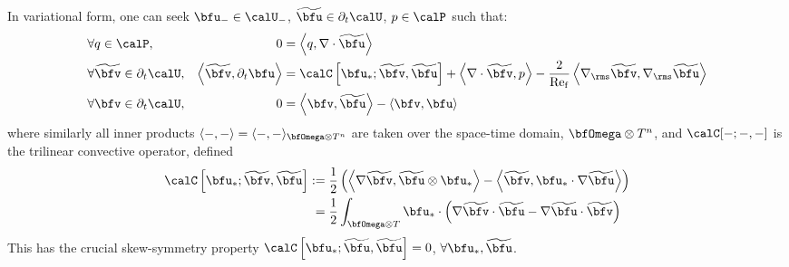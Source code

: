     In variational form, one can seek $\bfu_{-} \in \calU_{-}$, $\widetilde{\bfu} \in \partial_{t}\calU$, $p \in \calP$ such that:
    \begin{align}
        &\forall                 q  \in  \calP,              &                                                            0  &=  \left\langle q, \nabla\cdot\widetilde{\bfu}\right\rangle  \\
        &\forall  \widetilde{\bfv}  \in  \partial_{t}\calU,  &  \left\langle\widetilde{\bfv}, \partial_{t}\bfu\right\rangle  &=  \calC\left[\bfu_{*}; \widetilde{\bfv}, \widetilde{\bfu}\right] + \left\langle\nabla\cdot\widetilde{\bfv}, p\right\rangle - \frac{2}{\rmRef}\left\langle\nabla_{\rms}\widetilde{\bfv}, \nabla_{\rms}\widetilde{\bfu}\right\rangle  \\
        &\forall              \bfv  \in  \partial_{t}\calU,  &                                                            0  &=  \left\langle\bfv, \widetilde{\bfu}\right\rangle - \left\langle\bfv, \bfu\right\rangle
    \end{align}
    where similarly all inner products $\langle -, -\rangle  =  \langle -, -\rangle_{\bfOmega\otimes T^{n}}$ are taken over the space-time domain, $\bfOmega\otimes T^{n}$, and $\calC[-; -, -]$ is the trilinear convective operator, defined
    \begin{align}
        \calC\left[\bfu_{*}; \widetilde{\bfv}, \widetilde{\bfu}\right]  :=  &\;\frac{1}{2}\left(\left\langle\nabla\widetilde{\bfv}, \widetilde{\bfu}\otimes\bfu_{*}\right\rangle - \left\langle\widetilde{\bfv}, \bfu_{*}\cdot\nabla\widetilde{\bfu}\right\rangle\right)  \label{eqn:convective operator definition}  \\
                                                                         =  &\;\frac{1}{2}\int_{\bfOmega\otimes T}\bfu_{*}\cdot\left(\nabla\widetilde{\bfv}\cdot\widetilde{\bfu} - \nabla\widetilde{\bfu}\cdot\widetilde{\bfv}\right)
    \end{align}
    This has the crucial skew-symmetry property $\calC\left[\bfu_{*}; \widetilde{\bfu}, \widetilde{\bfu}\right]  =  0$, $\forall \bfu_{*}, \widetilde{\bfu}$.

    \line

